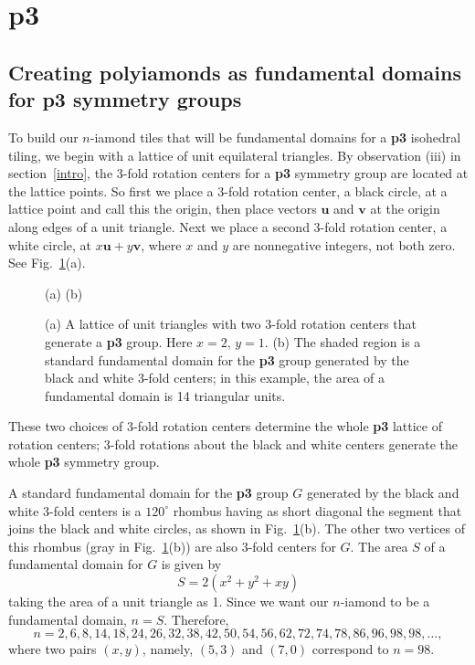 \documentclass{ws-ijcga}
\begin{document}
\section{{\bf p3}}
\label{p3}
\subsection{Creating polyiamonds as fundamental domains for {\bf p3} symmetry groups}
\label{p3:create}
To build our $n$-iamond tiles that will be fundamental domains for a {\bf p3} isohedral tiling, we begin
with a lattice of unit equilateral triangles. 
By observation (iii) in section~\ref{intro}, 
the 3-fold rotation centers for a {\bf p3} symmetry group are located at the lattice points. 
So first we place a 3-fold
rotation center, a black circle, at a lattice point and call this the origin, then place vectors 
$\mathbf u$ and $\mathbf v$
at the origin along edges of a unit triangle. 
Next we place a second 3-fold rotation center, a
white circle, at $x{\mathbf u} + y{\mathbf v}$, where $x$ and $y$ are nonnegative integers, 
not both zero. See Fig.~\ref{fig:p3}(a).
\begin{figure}[h]
\centerline{
}
\centerline{(a) \hspace{2.1cm} (b)}
\vspace*{8pt}
\caption{
(a) A lattice of unit triangles with two 3-fold rotation centers that generate a {\bf p3} group. 
Here $x = 2$, $y = 1$. 
(b) The shaded region is a standard fundamental domain for the {\bf p3} group generated by the black and white
3-fold centers; in this example, the area of a fundamental domain is 14 triangular units.
\label{fig:p3}
}
\end{figure}
These two choices of 3-fold rotation centers determine the whole {\bf p3} lattice of rotation centers; 
3-fold rotations about the black and white centers generate the whole {\bf p3} symmetry group.

A standard fundamental domain for the {\bf p3} group $G$ generated by the black and white 3-fold
centers is a $120^\circ$ rhombus having as short diagonal the segment that joins the black and white
circles, as shown in Fig.~\ref{fig:p3}(b). The other two vertices of this rhombus (gray in Fig.~\ref{fig:p3}(b)) are also
3-fold centers for $G$. The area $S$ of a fundamental domain for $G$ is given by
\begin{equation}
S=2 (x^2+y^2+xy)   
\end{equation}
taking the area of a unit triangle as 1. 
Since we want our $n$-iamond to be a fundamental
domain, $n = S$. Therefore,
\begin{equation}
n=2, 6, 8, 14, 18, 24, 26, 32, 38, 42, 50, 54, 56, 62, 72, 74, 78, 86, 96, 98, 98, \ldots,
\label{p3:n}
\end{equation}
where two pairs $(x,y)$, namely, $(5,3)$ and $(7,0)$ correspond to $n = 98$.
\end{document}

